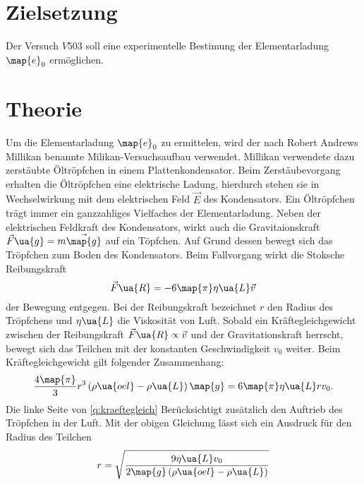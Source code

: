\setcounter{page}{1}
\section*{Zielsetzung}
Der Versuch $V503$ soll eine experimentelle Bestimung der Elementarladung $\map{e}_0$ ermöglichen. %
\section{Theorie}
Um die Elementarladung $\map{e}_0$ zu ermittelen, wird der nach Robert Andrews Millikan benannte %
Milikan-Versuchsaufbau verwendet. Millikan verwendete dazu zerstäubte Öltröpfchen in einem %
Plattenkondensator. Beim Zerstäubevorgang erhalten die Öltröpfchen eine elektrische
Ladung, hierdurch stehen sie in Wechselwirkung mit dem elektrischen Feld $\vec{E}$ des
Kondensators. Ein Öltröpfchen trägt immer ein ganzzahliges Vielfaches der Elementarladung. %
Neben der elektrischen Feldkraft des Kondensators, wirkt auch die Gravitaionskraft %
$\vec{F}\ua{g}=m\vec{\map{g}}$ auf ein Töpfchen. %
Auf Grund dessen bewegt sich das Tröpfchen zum Boden
des Kondensators. Beim Fallvorgang wirkt die Stoksche Reibungskraft %
\begin{equation*}
  \vec{F}\ua{R}=-6\map{\pi}\eta\ua{L}\vec{v}
\end{equation*}
der Bewegung entgegen. Bei der Reibungskraft bezeichnet $r$ den Radius des
Tröpfchens und $\eta\ua{L}$ die Viskosität von Luft. Sobald ein Kräftegleichgewicht
zwischen der Reibungskraft $\vec{F}\ua{R}\propto \vec{v}$ und der Gravitationskraft
herrscht, bewegt sich das Teilchen mit der konstanten Geschwindigkeit $v_0$ weiter.
Beim Kräftegleichgewicht gilt folgender Zusammenhang:
\begin{equation}
  \label{eq:kraeftegleich}
  \frac{4\map{\pi}}{3}r^3\left(\rho\ua{oel}-\rho\ua{L}\right)\map{g}=6\map{\pi}\eta\ua{L}r v_0.
\end{equation}
Die linke Seite von \eqref{q:kraeftegleich} Berücksichtigt zusätzlich den Auftrieb des %
Tröpfchen in der Luft. Mit der obigen Gleichung lässt sich ein Ausdruck für den Radius %
des Teilchen %
\begin{equation}
  \label{eq:radius_teilchen}
  r=\sqrt{\frac{9\eta\ua{L}v_0}{2\map{g}\left(\rho\ua{oel}-\rho\ua{L}\right)}}
\end{equation}

